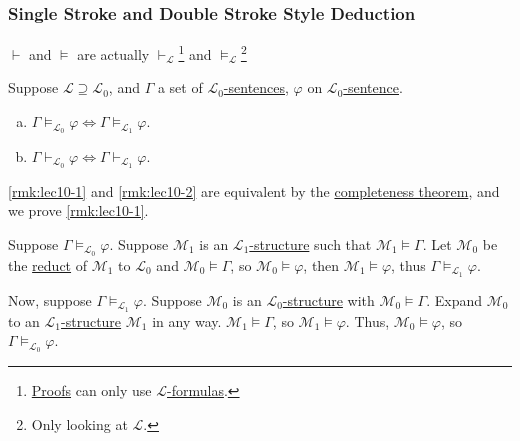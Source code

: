 \subsubsection{Single Stroke and Double Stroke Style Deduction}
\begin{prev}
	\(\vdash \) and \(\models \) are actually \(\vdash _{\mathcal{L} }\)\footnote{\hyperref[def:proof]{Proofs} can only use \hyperref[def:formula]{\(\mathcal{L}\)-formulas}.} and \(\models _\mathcal{L} \)\footnote{Only looking at \(\mathcal{L} \).}
\end{prev}

\begin{remark}
	Suppose \(\mathcal{L} \supseteq \mathcal{L} _0\), and \(\Gamma \) a set of \hyperref[def:sentence]{\(\mathcal{L} _0\)-sentences}, \(\varphi \) on \hyperref[def:sentence]{\(\mathcal{L} _0\)-sentence}.
	\begin{enumerate}[(a)]
		\item\label{rmk:lec10-1} \(\Gamma \models _{\mathcal{L} _0} \varphi \iff \Gamma \models _{\mathcal{L} _1} \varphi \).
		\item\label{rmk:lec10-2} \(\Gamma \vdash _{\mathcal{L} _0} \varphi \iff \Gamma \vdash _{\mathcal{L} _1} \varphi \).
	\end{enumerate}
\end{remark}
\begin{explanation}
	\autoref{rmk:lec10-1} and \autoref{rmk:lec10-2} are equivalent by the \hyperref[thm:completeness]{completeness theorem}, and we prove \autoref{rmk:lec10-1}.

	Suppose \(\Gamma \models _{\mathcal{L} _0} \varphi \). Suppose \(\mathcal{M} _1\) is an \hyperref[def:structure]{\(\mathcal{L} _1\)-structure} such that \(\mathcal{M} _1 \models \Gamma \). Let \(\mathcal{M} _0\) be the \hyperref[not:reduct]{reduct} of \(\mathcal{M} _1\) to \(\mathcal{L} _0\)  and \(\mathcal{M} _0 \models \Gamma \), so \(\mathcal{M} _0 \models \varphi \), then \(\mathcal{M} _1 \models \varphi \), thus \(\Gamma \models _{\mathcal{L} _1} \varphi \).

	Now, suppose \(\Gamma \models _{\mathcal{L} _1} \varphi \). Suppose \(\mathcal{M} _0\) is an \hyperref[def:structure]{\(\mathcal{L} _0\)-structure} with \(\mathcal{M} _0 \models \Gamma \). Expand \(\mathcal{M} _0\) to an \hyperref[def:structure]{\(\mathcal{L} _1\)-structure} \(\mathcal{M} _1\) in any way. \(\mathcal{M} _1 \models \Gamma \), so \(\mathcal{M} _1 \models \varphi \). Thus, \(\mathcal{M} _0 \models \varphi \), so \(\Gamma \models _{\mathcal{L} _0} \varphi \).
\end{explanation}



